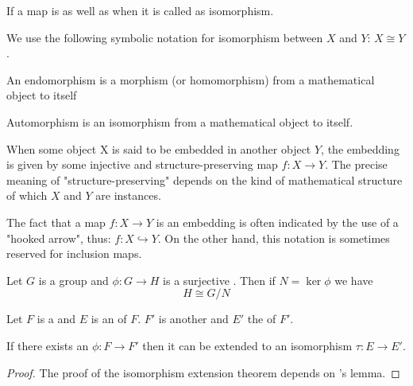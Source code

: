 \begin{appendices}
\begin{definition}[Isomorphism]
  If a map is  as well as
   when it is called as isomorphism.

  We use the following symbolic notation for isomorphism between $X$
  and $Y$: $X \cong Y$.
  \label{def:isomorphism}
\end{definition}

\begin{definition}[Endomorphism]
   An endomorphism is a morphism (or homomorphism) from a mathematical
   object to itself \cite{wiki:endomorphism}
   \label{def:endomorphism}
\end{definition}

\begin{definition}[Automorphism]
  Automorphism is an isomorphism from a mathematical object to itself.
  \label{def:automorphism}
\end{definition}

\begin{definition}[Embedding]
  When some object X is said to be embedded in another object $Y$, the
  embedding is given by some injective and structure-preserving map
  $f : X \to Y$. The precise meaning of "structure-preserving" depends on
  the kind of mathematical structure of which $X$ and $Y$ are
  instances.
  
  The fact that a map $f : X \to Y$ is an embedding is often indicated
  by the use of a "hooked arrow", thus: $f:X\hookrightarrow Y$. On the
  other hand, this notation is sometimes reserved for inclusion maps.
  \label{def:embedding}
\end{definition}

\begin{theorem}
  Let $G$ is a group and $\phi: G \to H$ is a
  surjective . Then if $N = \ker \phi$ we
  have
  \[
  H \cong G/N
  \]
  \label{thm:firstisomorphism}
\end{theorem}

\begin{theorem}
  Let $F$ is a  and $E$ is an
   of $F$.
  $F'$ is another  and $E'$ the 
   of $F'$.

  If there exists an  $\phi: F \to F'$ then
  it can be extended to an isomorphism $\tau: E \to E'$.

  \begin{proof}
    The proof of the isomorphism extension theorem depends on
    's lemma.


\end{proof}
\end{theorem}
\end{appendices}

